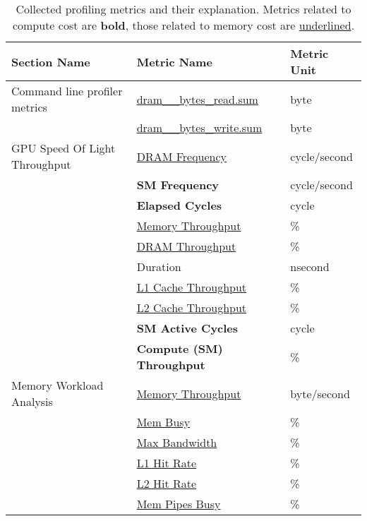 \begin{table}[t]
    \begin{tabular}{lll}
        \toprule
        Section Name                  & Metric Name                          & Metric Unit  \\
        \midrule\midrule
        Command line profiler metrics & \underline{dram\_\_bytes\_read.sum}  & byte         \\
                                      & \underline{dram\_\_bytes\_write.sum} & byte         \\
        GPU Speed Of Light Throughput & \underline{DRAM Frequency}           & cycle/second \\
                                      & \textbf{SM Frequency}                & cycle/second \\
                                      & \textbf{Elapsed Cycles}              & cycle        \\
                                      & \underline{Memory Throughput}        & \%           \\
                                      & \underline{DRAM Throughput}          & \%           \\
                                      & Duration                             & nsecond      \\
                                      & \underline{L1 Cache Throughput}      & \%           \\
                                      & \underline{L2 Cache Throughput}      & \%           \\
                                      & \textbf{SM Active Cycles}            & cycle        \\
                                      & \textbf{Compute (SM) Throughput}     & \%           \\
        Memory Workload Analysis      & \underline{Memory Throughput}        & byte/second  \\
                                      & \underline{Mem Busy}                 & \%           \\
                                      & \underline{Max Bandwidth}            & \%           \\
                                      & \underline{L1 Hit Rate}              & \%           \\
                                      & \underline{L2 Hit Rate}              & \%           \\
                                      & \underline{Mem Pipes Busy}           & \%           \\
        \bottomrule
    \end{tabular}
    \caption[Collected profiling metrics and their explanation]{Collected profiling metrics and their explanation. Metrics related to compute cost are \textbf{bold}, those related to memory cost are \underline{underlined}.}
    \label{tab:4-profiling-metrics}
\end{table}


